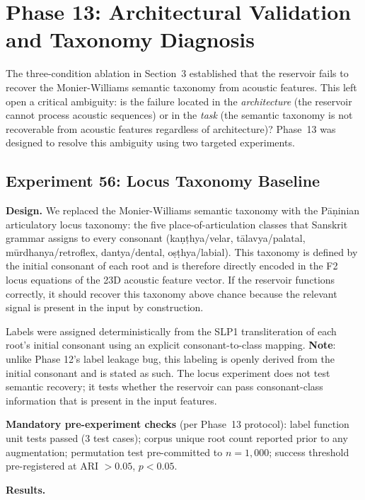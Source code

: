 \documentclass{article}
\begin{document}
\section{Phase 13: Architectural Validation and Taxonomy Diagnosis}
\label{sec:phase13}

The three-condition ablation in Section~3 established that the reservoir
fails to recover the Monier-Williams semantic taxonomy from acoustic features.
This left open a critical ambiguity: is the failure located in the
\emph{architecture} (the reservoir cannot process acoustic sequences) or
in the \emph{task} (the semantic taxonomy is not recoverable from acoustic
features regardless of architecture)? Phase~13 was designed to resolve
this ambiguity using two targeted experiments.

\subsection{Experiment 56: Locus Taxonomy Baseline}

\textbf{Design.} We replaced the Monier-Williams semantic taxonomy with
the Pāṇinian articulatory locus taxonomy: the five place-of-articulation
classes that Sanskrit grammar assigns to every consonant (kaṇṭhya/velar,
tālavya/palatal, mūrdhanya/retroflex, dantya/dental, oṣṭhya/labial). This
taxonomy is defined by the initial consonant of each root and is therefore
directly encoded in the F2 locus equations of the 23D acoustic feature
vector. If the reservoir functions correctly, it should recover this
taxonomy above chance because the relevant signal is present in the input
by construction.

Labels were assigned deterministically from the SLP1 transliteration of
each root's initial consonant using an explicit consonant-to-class mapping.
\textbf{Note}: unlike Phase 12's label leakage bug, this labeling is openly
derived from the initial consonant and is stated as such. The locus
experiment does not test semantic recovery; it tests whether the reservoir
can pass consonant-class information that is present in the input features.

\textbf{Mandatory pre-experiment checks} (per Phase~13 protocol):
label function unit tests passed (3 test cases); corpus unique root count
reported prior to any augmentation; permutation test pre-committed to
$n = 1{,}000$; success threshold pre-registered at ARI $> 0.05$,
$p < 0.05$.

\textbf{Results.}
\end{document}
